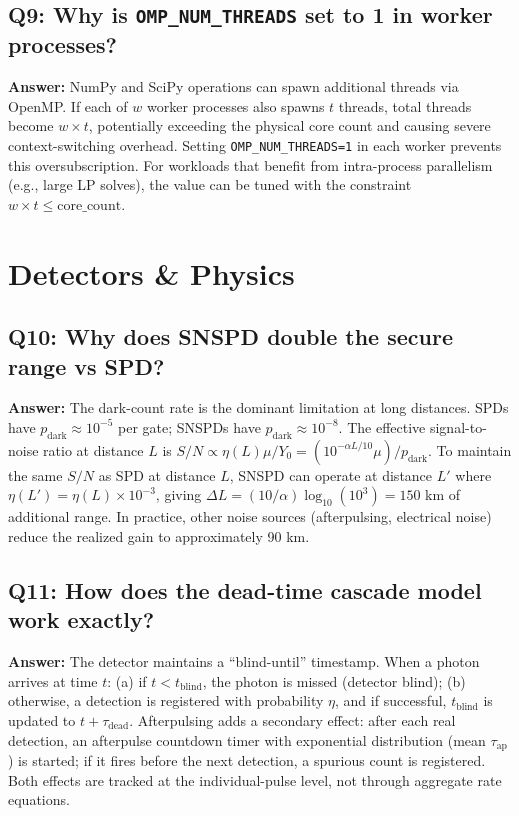 \documentclass[11pt,a4paper,oneside]{report}
\begin{document}
\subsection*{Q9: Why is \texttt{OMP\_NUM\_THREADS} set to 1 in worker processes?}
\textbf{Answer:} NumPy and SciPy operations can spawn additional threads via OpenMP. If each of $w$ worker processes also spawns $t$ threads, total threads become $w \times t$, potentially exceeding the physical core count and causing severe context-switching overhead. Setting \texttt{OMP\_NUM\_THREADS=1} in each worker prevents this oversubscription. For workloads that benefit from intra-process parallelism (e.g., large LP solves), the value can be tuned with the constraint $w \times t \leq \text{core\_count}$.

\section{Detectors \& Physics}

\subsection*{Q10: Why does SNSPD double the secure range vs SPD?}
\textbf{Answer:} The dark-count rate is the dominant limitation at long distances. SPDs have $p_{\text{dark}} \approx 10^{-5}$ per gate; SNSPDs have $p_{\text{dark}} \approx 10^{-8}$. The effective signal-to-noise ratio at distance $L$ is $S/N \propto \eta(L) \mu / Y_0 = (10^{-\alpha L/10}\mu)/p_{\text{dark}}$. To maintain the same $S/N$ as SPD at distance $L$, SNSPD can operate at distance $L'$ where $\eta(L') = \eta(L) \times 10^{-3}$, giving $\Delta L = (10/\alpha)\log_{10}(10^3) = 150$ km of additional range. In practice, other noise sources (afterpulsing, electrical noise) reduce the realized gain to approximately 90 km.

\subsection*{Q11: How does the dead-time cascade model work exactly?}
\textbf{Answer:} The detector maintains a ``blind-until'' timestamp. When a photon arrives at time $t$: (a) if $t < t_{\text{blind}}$, the photon is missed (detector blind); (b) otherwise, a detection is registered with probability $\eta$, and if successful, $t_{\text{blind}}$ is updated to $t + \tau_{\text{dead}}$. Afterpulsing adds a secondary effect: after each real detection, an afterpulse countdown timer with exponential distribution (mean $\tau_{\text{ap}}$) is started; if it fires before the next detection, a spurious count is registered. Both effects are tracked at the individual-pulse level, not through aggregate rate equations.
\end{document}
